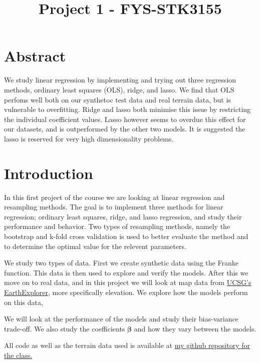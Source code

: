 \documentclass[11pt]{article}
\title{Project 1 - FYS-STK3155}
\begin{document}
    
    \maketitle
    
    

    
    \hypertarget{abstract}{%
\section{Abstract}\label{abstract}}

We study linear regression by implementing and trying out three
regression methods, ordinary least squares (OLS), ridge, and lasso. We
find that OLS perfoms well both on our synthetoc test data and real
terrain data, but is vulnerable to overfitting. Ridge and lasso both
minimise this issue by restricting the individual coefficient values.
Lasso however seems to overdue this effect for our datasets, and is
outperformed by the other two models. It is suggested the lasso is
reserved for very high dimensionality problems.

    \hypertarget{introduction}{%
\section{Introduction}\label{introduction}}

In this first project of the course we are looking at linear regression
and resampling methods. The goal is to implement three methods for
linear regression; ordinary least squares, ridge, and lasso regression,
and study their performance and behavior. Two types of resampling
methods, namely the bootstrap and k-fold cross validation is used to
better evaluate the method and to determine the optimal value for the
relevent parameters.

We study two types of data. First we create synthetic data using the
Franke function. This data is then used to explore and verify the
models. After this we move on to real data, and in this project we will
look at map data from \href{https://earthexplorer.usgs.gov/}{UCSG's
EarthExplorer}, more specifically elevation. We explore how the models
perform on this data,

We will look at the performance of the models and study their
bias-variance trade-off. We also study the coefficients
\(\boldsymbol{\beta}\) and how they vary between the models.

All code as well as the terrain data used is available at
\href{https://github.com/emiliefj/FYS-STK3155}{my github repository for
the class.}
\end{document}
